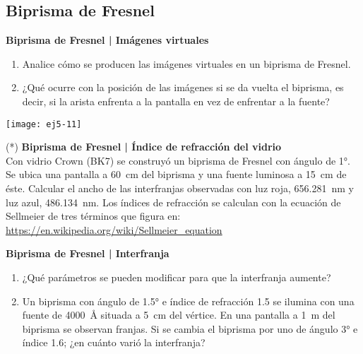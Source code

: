 \subsection*{Biprisma de Fresnel}


\item 
\textbf{Biprisma de Fresnel | Imágenes virtuales}\\
\begin{minipage}[t][3cm]{0.6\textwidth}
\begin{enumerate}
	\item Analice cómo se producen las imágenes virtuales en un biprisma de Fresnel.
	\item ¿Qué ocurre con la posición de las imágenes si se da vuelta el biprisma, es decir, si la arista enfrenta a la pantalla en vez de enfrentar a la fuente?
\end{enumerate}
\end{minipage}
\begin{minipage}[c][1cm][t]{0.35\textwidth}
	\texttt{[image: ej5-11]}
\end{minipage}



\item 
(*) \textbf{Biprisma de Fresnel | Índice de refracción del vidrio}\\
Con vidrio Crown (BK7) se construyó un biprisma de Fresnel con ángulo de \ang{1;;}.
Se ubica una pantalla a \SI{60}{\centi\metre} del biprisma y una fuente luminosa a \SI{15}{\centi\metre} de éste.
Calcular el ancho de las interfranjas observadas con luz roja, \SI{656.281}{\nano\metre} y luz azul, \SI{486.134}{\nano\metre}.
Los índices de refracción se calculan con la ecuación de Sellmeier de tres términos que figura en: \url{https://en.wikipedia.org/wiki/Sellmeier_equation} 



\item
\textbf{Biprisma de Fresnel | Interfranja}
\begin{enumerate}
\item ¿Qué parámetros se pueden modificar para que la interfranja aumente?
\item Un biprisma con ángulo de \ang{1.5;;} e índice de refracción \num{1.5} se ilumina con una fuente de \SI{4000}{\angstrom} situada a \SI{5}{\centi\metre} del vértice.
En una pantalla a \SI{1}{\metre} del biprisma se observan franjas.
Si se cambia el biprisma por uno de ángulo \ang{3;;} e índice \num{1.6}; ¿en cuánto varió la interfranja?
\end{enumerate}



